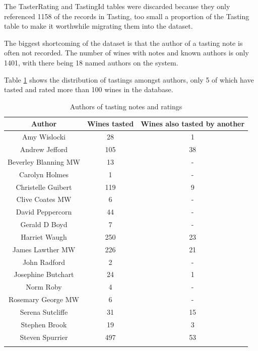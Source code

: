 The TasterRating and TastingId tables were discarded because they only referenced 1158 of the records in Tasting, too small a proportion of the Tasting table to make it worthwhile migrating them into the dataset.


The biggest shortcoming of the dataset is that the author of a tasting note is often not recorded. The number of wines with notes and known authors is only 1401, with there being 18 named authors on the system. 

Table \ref{table:authors} shows the distribution of tastings amongst authors, only 5 of which have tasted and rated more than 100 wines in the database.

\begin{table}[ht]
    \caption{Authors of tasting notes and ratings}
    \centering
    \begin{tabular}{c c c}
        \\\hline\hline
        Author               & Wines tasted & Wines also tasted by another
        \\\hline
        Amy Wislocki         &           28 & 1  \\
        Andrew Jefford       &          105 & 38 \\
        Beverley Blanning MW &           13 & -  \\
        Carolyn Holmes       &            1 & -  \\
        Christelle Guibert   &          119 & 9  \\
        Clive Coates MW      &            6 & -  \\
        David Peppercorn     &           44 & -  \\
        Gerald D Boyd        &            7 & -  \\
        Harriet Waugh        &          250 & 23 \\
        James Lawther MW     &          226 & 21 \\
        John Radford         &            2 & -  \\
        Josephine Butchart   &           24 & 1  \\
        Norm Roby            &            4 & -  \\
        Rosemary George MW   &            6 & -  \\
        Serena Sutcliffe     &           31 & 15 \\
        Stephen Brook        &           19 & 3  \\
        Steven Spurrier      &          497 & 53 \\
        \\\hline
    \end{tabular}
    \label{table:authors}
\end{table}

